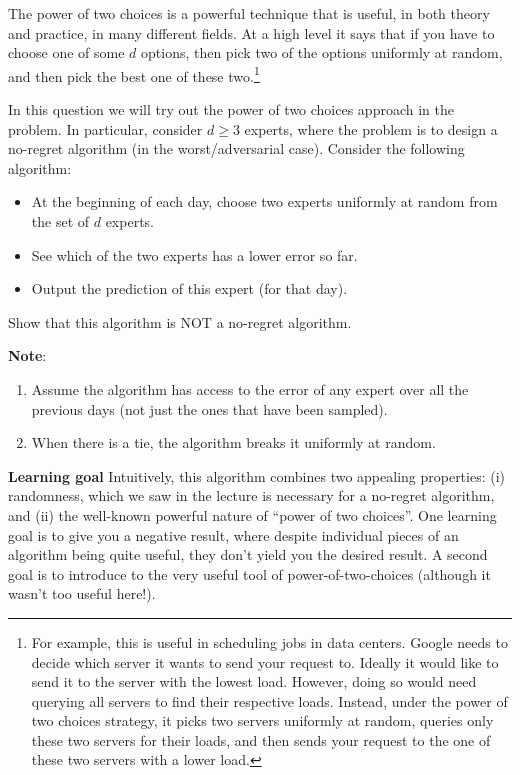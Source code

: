 The power of two choices is a powerful technique that is useful, in both theory and practice, in many different fields. At a high level it says that if you have to choose one of some $d$ options, then pick two of the options uniformly at random, and then pick the best one of these two.\footnote{For example, this is useful in  scheduling jobs in data centers. Google needs to decide which server it wants to send your request to. Ideally it would like to send it to the server with the lowest load. However, doing so would need querying all servers to find their respective loads. Instead, under the power of two choices strategy, it picks two servers uniformly at random, queries only these two servers for their loads, and then sends your request to the one of these two servers with a lower load.}

In this question we will try out the power of two choices approach in the  problem. In particular, consider $d\geq3$ experts, where the problem is to design a no-regret algorithm (in the worst/adversarial case). Consider the following algorithm:

\begin{itemize}
    \item At the beginning of each day, choose two experts uniformly at random from the set of $d$ experts.
    \item See which of the two experts has a lower error so far.
    \item Output the prediction of this expert (for that day).
\end{itemize}

Show that this algorithm is NOT a no-regret algorithm.

\textbf{Note}:
\begin{enumerate}
    \item Assume the algorithm has access to the error of any expert over all the previous days (not just the ones that have been sampled).
    \item When there is a tie, the algorithm breaks it uniformly at random.
\end{enumerate}
\textbf{Learning goal} Intuitively, this algorithm combines two appealing properties: (i) randomness, which we saw in the lecture is necessary for a no-regret algorithm, and (ii) the well-known powerful nature of ``power of two choices''. One learning goal is to give you a negative result, where despite individual pieces of an algorithm being quite useful, they don't yield you the desired result. A second goal is to introduce to the very useful tool of power-of-two-choices (although it wasn't too useful here!).

